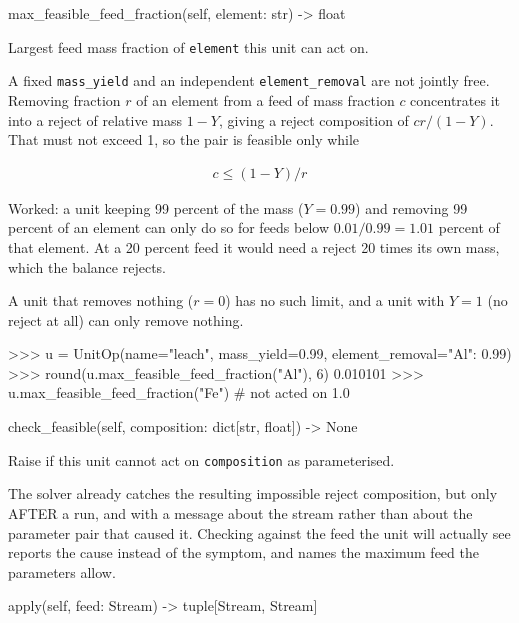 \documentclass[10pt,a4paper,twoside]{report}
\begin{document}
\begin{verbatimsmall}
max_feasible_feed_fraction(self, element: str) -> float
\end{verbatimsmall}

Largest feed mass fraction of \texttt{element} this unit can act on.

A fixed \texttt{mass\_yield} and an independent \texttt{element\_removal} are not jointly free. Removing fraction $r$ of an element from a feed of mass fraction $c$ concentrates it into a reject of relative mass $1 - Y$, giving a reject composition of $c r / (1 - Y)$. That must not exceed 1, so the pair is feasible only while

\begin{equation*}
\begin{gathered}
c \le (1 - Y) / r
\end{gathered}
\end{equation*}

Worked: a unit keeping 99 percent of the mass ($Y = 0.99$) and removing 99 percent of an element can only do so for feeds below $0.01 / 0.99 = 1.01$ percent of that element. At a 20 percent feed it would need a reject 20 times its own mass, which the balance rejects.

A unit that removes nothing ($r = 0$) has no such limit, and a unit with $Y = 1$ (no reject at all) can only remove nothing.

\begin{doctestblock}
>>> u = UnitOp(name="leach", mass_yield=0.99, element_removal={"Al": 0.99})
>>> round(u.max_feasible_feed_fraction("Al"), 6)
0.010101
>>> u.max_feasible_feed_fraction("Fe")   # not acted on
1.0
\end{doctestblock}

\begin{verbatimsmall}
check_feasible(self, composition: dict[str, float]) -> None
\end{verbatimsmall}

Raise if this unit cannot act on \texttt{composition} as parameterised.

The solver already catches the resulting impossible reject composition, but only AFTER a run, and with a message about the stream rather than about the parameter pair that caused it. Checking against the feed the unit will actually see reports the cause instead of the symptom, and names the maximum feed the parameters allow.

\begin{verbatimsmall}
apply(self, feed: Stream) -> tuple[Stream, Stream]
\end{verbatimsmall}
\end{document}
